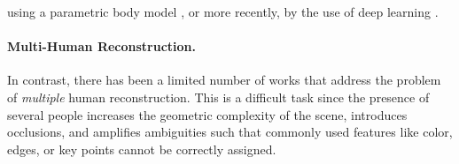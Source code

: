 using a parametric body model  \cite{huang2017towards, balan2007detailed}, %
or more recently, by the use of deep learning \cite{huang2018deep,liang2019shape, wang2022arah, liu2021neural, peng2021neural,  kwon2021neural, peng2021animatable, xu2021h, weng2022humannerf}. 
%
%
%
%
%
%
%
\paragraph{Multi-Human Reconstruction.} 
In contrast, there has been a limited number of works that address the problem of \emph{multiple} human reconstruction. 
This is a difficult task since the presence of several people increases the geometric complexity of the scene, introduces occlusions,  and amplifies ambiguities such that commonly used features like color, edges, or key points cannot be correctly assigned. 

